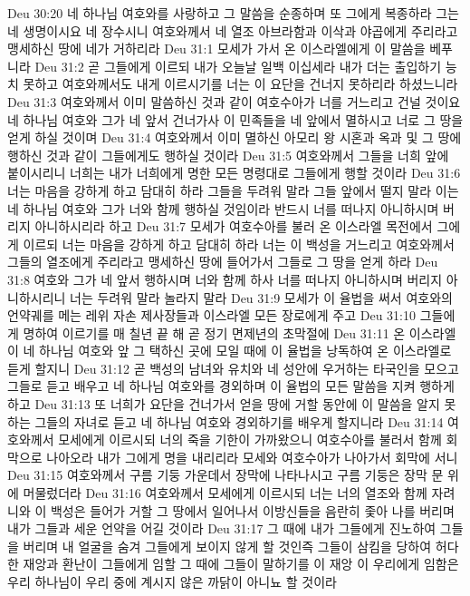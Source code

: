 Deu 30:20  네 하나님 여호와를 사랑하고 그 말씀을 순종하며 또 그에게 복종하라 그는 네 생명이시요 네 장수시니 여호와께서 네 열조 아브라함과 이삭과 야곱에게 주리라고 맹세하신 땅에 네가 거하리라
Deu 31:1  모세가 가서 온 이스라엘에게 이 말씀을 베푸니라
Deu 31:2  곧 그들에게 이르되 내가 오늘날 일백 이십세라 내가 더는 출입하기 능치 못하고 여호와께서도 내게 이르시기를 너는 이 요단을 건너지 못하리라 하셨느니라
Deu 31:3  여호와께서 이미 말씀하신 것과 같이 여호수아가 너를 거느리고 건널 것이요 네 하나님 여호와 그가 네 앞서 건너가사 이 민족들을 네 앞에서 멸하시고 너로 그 땅을 얻게 하실 것이며
Deu 31:4  여호와께서 이미 멸하신 아모리 왕 시혼과 옥과 및 그 땅에 행하신 것과 같이 그들에게도 행하실 것이라
Deu 31:5  여호와께서 그들을 너희 앞에 붙이시리니 너희는 내가 너희에게 명한 모든 명령대로 그들에게 행할 것이라
Deu 31:6  너는 마음을 강하게 하고 담대히 하라 그들을 두려워 말라 그들 앞에서 떨지 말라 이는 네 하나님 여호와 그가 너와 함께 행하실 것임이라 반드시 너를 떠나지 아니하시며 버리지 아니하시리라 하고
Deu 31:7  모세가 여호수아를 불러 온 이스라엘 목전에서 그에게 이르되 너는 마음을 강하게 하고 담대히 하라 너는 이 백성을 거느리고 여호와께서 그들의 열조에게 주리라고 맹세하신 땅에 들어가서 그들로 그 땅을 얻게 하라
Deu 31:8  여호와 그가 네 앞서 행하시며 너와 함께 하사 너를 떠나지 아니하시며 버리지 아니하시리니 너는 두려워 말라 놀라지 말라
Deu 31:9  모세가 이 율법을 써서 여호와의 언약궤를 메는 레위 자손 제사장들과 이스라엘 모든 장로에게 주고
Deu 31:10  그들에게 명하여 이르기를 매 칠년 끝 해 곧 정기 면제년의 초막절에
Deu 31:11  온 이스라엘이 네 하나님 여호와 앞 그 택하신 곳에 모일 때에 이 율법을 낭독하여 온 이스라엘로 듣게 할지니
Deu 31:12  곧 백성의 남녀와 유치와 네 성안에 우거하는 타국인을 모으고 그들로 듣고 배우고 네 하나님 여호와를 경외하며 이 율법의 모든 말씀을 지켜 행하게 하고
Deu 31:13  또 너희가 요단을 건너가서 얻을 땅에 거할 동안에 이 말씀을 알지 못하는 그들의 자녀로 듣고 네 하나님 여호와 경외하기를 배우게 할지니라
Deu 31:14  여호와께서 모세에게 이르시되 너의 죽을 기한이 가까왔으니 여호수아를 불러서 함께 회막으로 나아오라 내가 그에게 명을 내리리라 모세와 여호수아가 나아가서 회막에 서니
Deu 31:15  여호와께서 구름 기둥 가운데서 장막에 나타나시고 구름 기둥은 장막 문 위에 머물렀더라
Deu 31:16  여호와께서 모세에게 이르시되 너는 너의 열조와 함께 자려니와 이 백성은 들어가 거할 그 땅에서 일어나서 이방신들을 음란히 좇아 나를 버리며 내가 그들과 세운 언약을 어길 것이라
Deu 31:17  그 때에 내가 그들에게 진노하여 그들을 버리며 내 얼굴을 숨겨 그들에게 보이지 않게 할 것인즉 그들이 삼킴을 당하여 허다한 재앙과 환난이 그들에게 임할 그 때에 그들이 말하기를 이 재앙 이 우리에게 임함은 우리 하나님이 우리 중에 계시지 않은 까닭이 아니뇨 할 것이라
